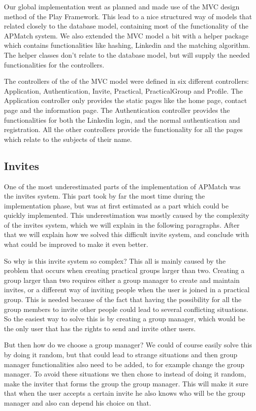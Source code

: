 Our global implementation went as planned and made use of the MVC design method of the Play Framework.
This lead to a nice structured way of models that related closely to the database model, containing most of the functionality of the APMatch system.
We also extended the MVC model a bit with a helper package which contains functionalities like hashing, Linkedin and the matching algorithm.
The helper classes don't relate to the database model, but will supply the needed functionalities for the controllers.

The controllers of the of the MVC model were defined in six different controllers: Application, Authentication, Invite, Practical, PracticalGroup and Profile.
The Application controller only provides the static pages like the home page, contact page and the information page.
The Authentication controller provides the functionalities for both the Linkedin login, and the normal authentication and registration.
All the other controllers provide the functionality for all the pages which relate to the subjects of their name.

\subsection{Invites}
One of the most underestimated parts of the implementation of APMatch was the invites system.
This part took by far the most time during the implementation phase, but was at first estimated as a part which could be quickly implemented.
This underestimation was mostly caused by the complexity of the invites system, which we will explain in the following paragraphs.
After that we will explain how we solved this difficult invite system, and conclude with what could be improved to make it even better.

So why is this invite system so complex?
This all is mainly caused by the problem that occurs when creating practical groups larger than two.
Creating a group larger than two requires either a group manager to create and maintain invites, or a different way of inviting people when the user is joined in a practical group.
This is needed because of the fact that having the possibility for all the group members to invite other people could lead to several conflicting situations.
So the easiest way to solve this is by creating a group manager, which would be the only user that has the rights to send and invite other users.

But then how do we choose a group manager?
We could of course easily solve this by doing it random, but that could lead to strange situations and then group manager functionalities also need to be added, to for example change the group manager.
To avoid these situations we then chose to instead of doing it random, make the inviter that forms the group the group manager.
This will make it sure that when the user accepts a certain invite he also knows who will be the group manager and also can depend his choice on that.

